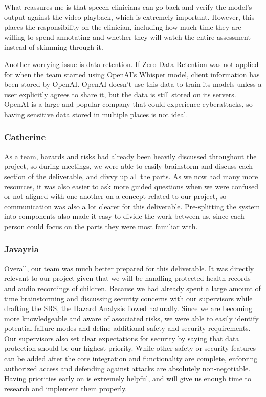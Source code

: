 \documentclass{article}
\begin{document}
What reassures me is that speech clinicians can go back and verify the model’s output against the video playback, which is extremely important. However, this places the responsibility on the clinician, including how much time they are willing to spend annotating and whether they will watch the entire assessment instead of skimming through it.

Another worrying issue is data retention. 
If Zero Data Retention was not applied for when the team started using OpenAI’s Whisper model, client information has been stored by OpenAI. 
OpenAI doesn’t use this data to train its models unless a user explicitly agrees to share it, but the data is still stored on its servers. 
OpenAI is a large and popular company that could experience cyberattacks, so having sensitive data stored in multiple places is not ideal.

\subsubsection*{Catherine}
As a team, hazards and risks had already been heavily discussed throughout the project, so
during meetings, we were able to easily brainstorm and discuss each section of the deliverable,
and divvy up all the parts. As we now had many more resources, it was also easier to
ask more guided questions when we were confused or not aligned with one another on a concept
related to our project, so communication was also a lot clearer for this deliverable. 
Pre-splitting the system into components also made it easy 
to divide the work between us, since each person could focus on the parts they were most
familiar with.

\subsubsection*{Javayria}
Overall, our team was much better prepared for this deliverable. It was directly relevant to our project given that we will be handling protected health records and audio recordings of children. Because we had already spent a large amount of time brainstorming and discussing security concerns with our supervisors while drafting the SRS, the Hazard Analysis flowed naturally. Since we are becoming more knowledgeable and aware of associated risks, we were able to easily identify potential failure modes and define additional safety and security requirements. Our supervisors also set clear expectations for security by saying that data protection should be our highest priority. While other safety or security features can be added after the core integration and functionality are complete, enforcing authorized access and defending against attacks are absolutely non-negotiable. Having priorities early on is extremely helpful, and will give us enough time to research and implement them properly.
\end{document}
